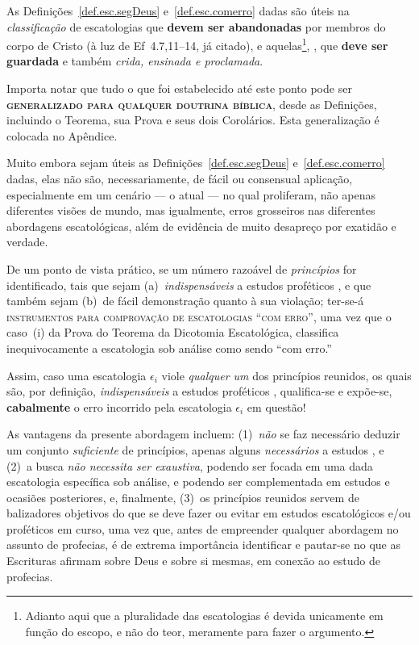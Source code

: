     As Definições~\ref{def.esc.segDeus} e~\ref{def.esc.comerro} dadas são úteis  na  \emph{classificação}  de  escatologias  que
    \textbf{devem  ser  abandonadas}  por  membros  do  corpo   de   Cristo   (à   luz   de   Ef~4.7,11--14,   já   citado),   e
    aquelas\footnote{Adianto aqui que a pluralidade das escatologias  é  devida  unicamente  em  função  do
    escopo, e não do teor, meramente para fazer o argumento.}, , que \textbf{deve ser  guardada}  e  também
    \emph{crida, ensinada e proclamada}.

    Importa notar que tudo o que foi estabelecido até este ponto pode ser \textbf{\textsc{generalizado  para  qualquer  doutrina
    bíblica}}, desde as Definições, incluindo o Teorema, sua Prova e seus dois Corolários.  Esta  generalização  é  colocada  no
    Apêndice.

    Muito embora sejam úteis as Definições~\ref{def.esc.segDeus} e~\ref{def.esc.comerro} dadas, elas não  são,  necessariamente,
    de fácil ou consensual aplicação, especialmente em um cenário --- o atual --- no  qual  proliferam,  não  apenas  diferentes
    visões de mundo, mas igualmente, erros grosseiros nas diferentes  abordagens  escatológicas,  além  de  evidência  de  muito
    desapreço por exatidão e verdade.

    De  um  ponto  de  vista  prático,  se  um  número  razoável  de  \emph{princípios}  for  identificado,   tais   que   sejam
    (a)~\emph{indispensáveis} a estudos proféticos , e que também sejam (b)~de fácil demonstração quanto  à
    sua violação; ter-se-á \textsc{instrumentos para comprovação de escatologias ``com erro''}, uma vez que o caso~(i) da  Prova
    do Teorema da Dicotomia Escatológica, classifica inequivocamente a escatologia sob análise como sendo ``com erro.''

    Assim, caso uma escatologia $\epsilon_i$ viole \emph{qualquer um} dos princípios reunidos,  os  quais  são,  por  definição,
    \emph{indispensáveis} a estudos proféticos ,  qualifica-se  e  expõe-se,  \textbf{cabalmente}  o  erro
    incorrido pela escatologia $\epsilon_i$ em questão!

    As vantagens da presente abordagem incluem: (1)~\emph{não} se  faz  necessário  deduzir  um  conjunto  \emph{suficiente}  de
    princípios, apenas alguns \emph{necessários} a  estudos  ,  e  (2)~a  busca  \emph{não  necessita  ser
    exaustiva}, podendo ser focada em uma dada escatologia específica sob análise, e podendo  ser  complementada  em  estudos  e
    ocasiões posteriores, e, finalmente, (3)~os princípios reunidos servem de balizadores objetivos do  que  se  deve  fazer  ou
    evitar em estudos escatológicos e/ou proféticos em curso, uma vez que, antes de empreender qualquer abordagem no assunto  de
    profecias, é de extrema importância identificar e pautar-se no que as Escrituras afirmam sobre Deus e sobre  si  mesmas,  em
    conexão ao estudo de profecias.


